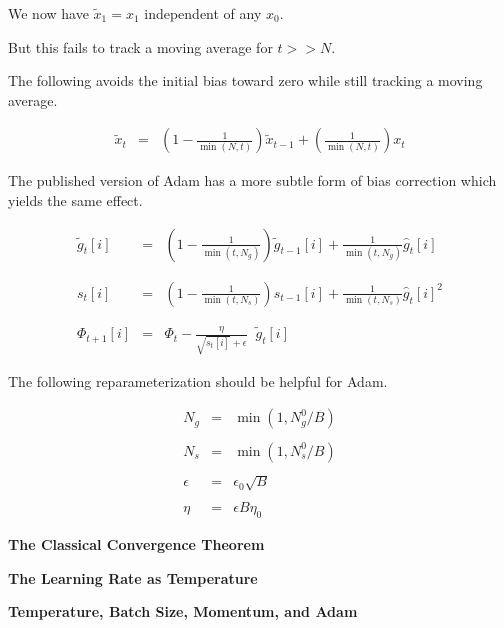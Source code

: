 {\vfill
We now have $\tilde{x}_1 = x_1$ independent of any $x_0$.

\vfill
But this fails to track a moving average for $t >> N$.


The following avoids the initial bias toward zero while still tracking a moving average.

\begin{eqnarray*}
\tilde{x}_t & = & \left(1-\frac{1}{\min(N,t)}\right)\tilde{x}_{t-1} + \left(\frac{1}{\min(N,t)}\right)x_t
\end{eqnarray*}

\vfill
The published version of Adam has a more subtle form of bias correction which yields the same effect.


\begin{eqnarray*}
  \tilde{g}_{t}[i] & = & \left(1-\frac{1}{\min(t,N_g)}\right)\tilde{g}_{t-1}[i] + \frac{1}{\min(t,N_g)} \hat{g}_t[i] \\
  \\
  \\
  s_{t}[i] & = & \left(1-\frac{1}{\min(t,N_s)}\right)s_{t-1}[i] + \frac{1}{\min(t,N_s)} \hat{g}_t[i]^2 \\
  \\
  \\
\Phi_{t+1}[i] & =  & \Phi_t - \frac{\eta}{\sqrt{s_{t}[i]} + \epsilon}\;\;\tilde{g}_{t}[i]
\end{eqnarray*}


The following reparameterization should be helpful for Adam.

\begin{eqnarray*}
N_g & = & \min(1,N^0_g/B) \\
\\
N_s & = & \min(1,N^0_s/B) \\
\\
\epsilon & = & \epsilon_0\sqrt{B} \\
\\
\eta & = & \epsilon B \eta_0
\end{eqnarray*}


  \centerline{\bf The Classical Convergence Theorem}
  \vfill
  \centerline{\bf The Learning Rate as Temperature}
  \vfill
  \centerline{\bf Temperature, Batch Size, Momentum, and Adam}


} 


